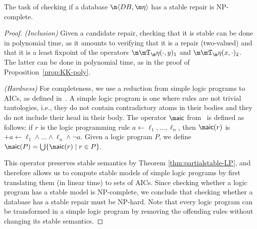 \begin{proposition}\label{prop:stable-complexity}
  The task of checking if a database $\fulldb$ has a stable repair is NP-complete.
\end{proposition}
\begin{proof}
  \emph{(Inclusion)} Given a candidate repair, checking that it is stable can be done in polynomial time, as it amounts to verifying that it is a repair (two-valued) and that it is a least fixpoint of the operators $\Ap(\cdot,y)_1$ and $\Ap(x,\cdot)_2$.
  The latter can be done in polynomial time, as in the proof of Proposition~\ref{prop:KK-poly}.

  \emph{(Hardness)} For completeness, we use a reduction from simple logic programs to AICs, as defined in~\cite{tplp/CaropreseT11}.
  A simple logic program is one where rules are not trivial tautologies, i.e., they do not contain contradictory atoms in their bodies and they do not include their head in their body.
  The operator $\aicop$ from~\cite{tplp/CaropreseT11} is defined as follows: if $r$ is the logic programming rule $a\leftarrow \ell_1,\ldots,\ell_n$, then $\aicop(r)$ is ${+a}\leftarrow \ell_1\wedge\ldots\wedge\ell_n\wedge\neg a$.
  Given a logic program $P$, we define $\aicop(P)=\bigcup\{\aicop(r)\mid r\in P\}$.

  This operator preserves stable semantics by Theorem \ref{thm:partialstable-LP}, and therefore allows us to compute stable models of simple logic programs by first translating them (in linear time) to sets of AICs.
  Since checking whether a logic program has a stable model is NP-complete, we conclude that checking whether a database has a stable repair must be NP-hard.
  Note that every logic program can be transformed in a simple logic program by removing the offending rules without changing its stable semantics.
\end{proof}

